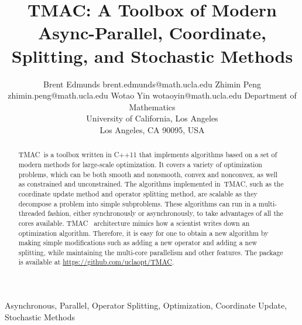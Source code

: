 \documentclass[twoside,11pt]{article}
\newcommand{\pkg}{{TMAC}}
\newcommand{\repo}{\url{https://github.com/uclaopt/TMAC}}
\begin{document}
\title{\pkg: A Toolbox of Modern Async-Parallel, Coordinate, Splitting, and Stochastic Methods}

\author{\name Brent Edmunds \email brent.edmunds@math.ucla.edu
       \AND
       \name Zhimin Peng \email zhimin.peng@math.ucla.edu
       \AND
        \name Wotao Yin \email wotaoyin@math.ucla.edu 
       \AND
       \addr Department of Mathematics\\
       University of California, Los Angeles\\
       Los Angeles, CA 90095, USA}

\maketitle

\begin{abstract}
\pkg~is a toolbox written in C++11 that implements algorithms based on a set of modern methods for large-scale optimization. It covers a variety of optimization problems, which can be both smooth and nonsmooth, convex and nonconvex, as well as constrained and unconstrained. The algorithms implemented in~\pkg, such as the coordinate update method and operator splitting method, are scalable as they decompose a problem into simple subproblems. These algorithms can run in a multi-threaded fashion, either synchronously or asynchronously, to take advantages of all the cores available. \pkg~ architecture mimics how a scientist writes down an optimization algorithm. Therefore, it is easy for one to obtain a new algorithm by making simple modifications such as adding a new operator and adding a new splitting, while maintaining the multi-core parallelism and other features. The package is available at \repo.
\end{abstract}

\begin{keywords}
Asynchronous, Parallel, Operator Splitting, Optimization, Coordinate Update, Stochastic Methods
\end{keywords}








% 

%

%

%


% 


% 

% 

% 





\end{document}
